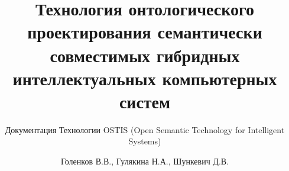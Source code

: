 \documentclass[graybox,envcountchap,sectrefs]{svmono}
\begin{document}
\DeactivateBG
\author{Голенков В.В., Гулякина Н.А., Шункевич Д.В.}
\title{Технология онтологического проектирования семантически совместимых гибридных интеллектуальных компьютерных систем}
\subtitle{Документация Технологии OSTIS (Open Semantic Technology for Intelligent Systems)}
\maketitle

\mainmatter%
\normalsize
\ActivateBG
\addtocounter{chapter}{-1}


\ActivateBG





%

%
%
%


\backmatter%
%

\end{document}
